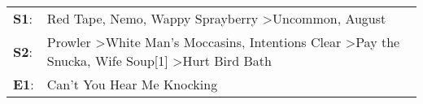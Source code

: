 \begin{supertabular}{p{0.03\textwidth}p{0.92\textwidth}}
 \textbf{S1}:  &                                                                                                 Red Tape\textsuperscript{}, \enspace Nemo\textsuperscript{}, \enspace Wappy Sprayberry\textsuperscript{} \textgreater \enspace Uncommon\textsuperscript{}, \enspace August\textsuperscript{}  \enspace  \\
 \textbf{S2}:  &  Prowler\textsuperscript{} \textgreater \enspace White Man's Moccasins\textsuperscript{}, \enspace Intentions Clear\textsuperscript{} \textgreater \enspace Pay the Snucka\textsuperscript{}, \enspace Wife Soup[1]\textsuperscript{} \textgreater \enspace Hurt Bird Bath\textsuperscript{}  \enspace  \\
 \textbf{E1}:  &                                                                                                                                                                                                                                                 Can't You Hear Me Knocking\textsuperscript{}  \enspace  \\
\end{supertabular}
